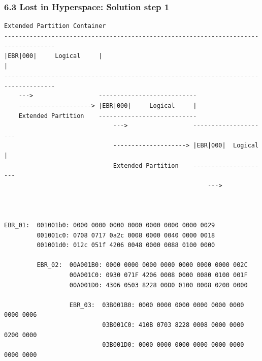 \begin{frame}[fragile]
    \frametitle{6.3 Lost in Hyperspace: Solution step 1}
  \begin{lstlisting}[basicstyle=\tiny]
                           Extended Partition Container                          
------------------------------------------------------------------------------------
|EBR|000|     Logical     |                                                        |
------------------------------------------------------------------------------------
    --->                  ---------------------------
    --------------------> |EBR|000|     Logical     |
    Extended Partition    ---------------------------
                              --->                  ---------------------
                              --------------------> |EBR|000|  Logical  |
                              Extended Partition    ---------------------
                                                        --->



EBR_01:  001001b0: 0000 0000 0000 0000 0000 0000 0000 0029
         001001c0: 0708 0717 0a2c 0008 0000 0040 0000 0018
         001001d0: 012c 051f 4206 0048 0000 0088 0100 0000

         EBR_02:  00A001B0: 0000 0000 0000 0000 0000 0000 0000 002C
                  00A001C0: 0930 071F 4206 0008 0000 0080 0100 001F
                  00A001D0: 4306 0503 8228 00D0 0100 0008 0200 0000

                  EBR_03:  03B001B0: 0000 0000 0000 0000 0000 0000 0000 0006
                           03B001C0: 410B 0703 8228 0008 0000 0000 0200 0000
                           03B001D0: 0000 0000 0000 0000 0000 0000 0000 0000
  \end{lstlisting}
\end{frame}


